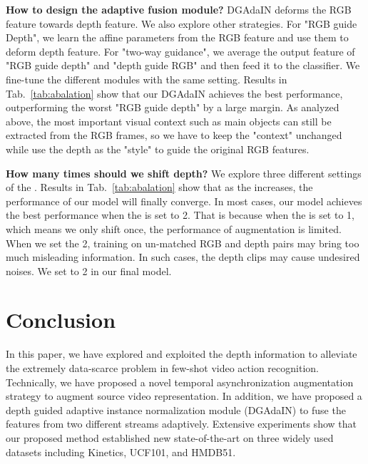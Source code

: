 \documentclass[sigconf]{acmart}
\begin{document}
	
	
	
	\noindent\textbf{How to design the adaptive fusion module?} 
	DGAdaIN deforms the RGB feature towards depth feature.
	We also explore other strategies.
	For "RGB guide Depth", we learn the affine parameters from the RGB feature and use them to deform depth feature. 
	For "two-way guidance", we average the output feature of "RGB guide depth" and "depth guide RGB" and then feed it to the classifier.
	We fine-tune the different modules with the same setting.
	Results in Tab.~\ref{tab:abalation} show that our DGAdaIN achieves the best performance, outperforming the worst "RGB guide depth" by a large margin. 
	As analyzed above, the most important visual context such as main objects can still be extracted from the RGB frames, so we have to keep the "context" unchanged while use the depth as the "style" to guide the original RGB features.  
	
	\noindent\textbf{How many times should we shift depth?} 
	We explore three different settings of the . 
	Results in Tab.~\ref{tab:abalation} show that as the  increases, the performance of our model will finally converge. In most cases, our model achieves the best performance when the  is set to 2. 
	That is because when the  is set to 1, which means we only shift once, the performance of augmentation is limited. 
	When we set the   2, training on  un-matched RGB and depth pairs may bring too much misleading information. In such cases, the depth clips may cause undesired noises. We set  to 2 in our final model.
	
	
	
	\section{Conclusion} 
	In this paper, we have explored and exploited the depth information to alleviate the extremely data-scarce problem in few-shot video action recognition. Technically, we have proposed a novel temporal asynchronization augmentation strategy to augment source video representation. In addition, we have proposed a depth guided adaptive instance normalization module (DGAdaIN) to fuse the features from two different streams adaptively. Extensive experiments show that our proposed method established new state-of-the-art on three widely used datasets including Kinetics, UCF101, and HMDB51.
	
	
	
	 
	
\end{document}
